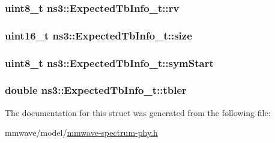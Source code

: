 \subsubsection[{\texorpdfstring{rv}{rv}}]{\setlength{\rightskip}{0pt plus 5cm}uint8\+\_\+t ns3\+::\+Expected\+Tb\+Info\+\_\+t\+::rv}\hypertarget{structns3_1_1ExpectedTbInfo__t_a9c96ee4c0c2454056f63e9af8dab0ef0}{}\label{structns3_1_1ExpectedTbInfo__t_a9c96ee4c0c2454056f63e9af8dab0ef0}
\subsubsection[{\texorpdfstring{size}{size}}]{\setlength{\rightskip}{0pt plus 5cm}uint16\+\_\+t ns3\+::\+Expected\+Tb\+Info\+\_\+t\+::size}\hypertarget{structns3_1_1ExpectedTbInfo__t_aef09532dd50e1eb35b3a3174b25981fd}{}\label{structns3_1_1ExpectedTbInfo__t_aef09532dd50e1eb35b3a3174b25981fd}
\subsubsection[{\texorpdfstring{sym\+Start}{symStart}}]{\setlength{\rightskip}{0pt plus 5cm}uint8\+\_\+t ns3\+::\+Expected\+Tb\+Info\+\_\+t\+::sym\+Start}\hypertarget{structns3_1_1ExpectedTbInfo__t_a61e47605cfadaf90f8592c95ba9e8758}{}\label{structns3_1_1ExpectedTbInfo__t_a61e47605cfadaf90f8592c95ba9e8758}
\subsubsection[{\texorpdfstring{tbler}{tbler}}]{\setlength{\rightskip}{0pt plus 5cm}double ns3\+::\+Expected\+Tb\+Info\+\_\+t\+::tbler}\hypertarget{structns3_1_1ExpectedTbInfo__t_aae2e167ee387ee189e3c17d5f44c43ac}{}\label{structns3_1_1ExpectedTbInfo__t_aae2e167ee387ee189e3c17d5f44c43ac}


The documentation for this struct was generated from the following file\+:\begin{DoxyCompactItemize}
\item 
mmwave/model/\hyperlink{mmwave-spectrum-phy_8h}{mmwave-\/spectrum-\/phy.\+h}\end{DoxyCompactItemize}
